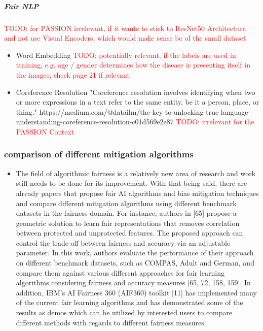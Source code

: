 \documentclass[12pt, a4paper, oneside]{book}   	%
\renewcommand{\todo}[1]{\textcolor{red}{TODO: #1}}
\renewcommand{\paragraph}[1]{%
	\subsubsection*{#1}%
}
\begin{document}
			\subparagraph{Fair NLP}
				\todo{for PASSION irrelevant, if it wants to stick to ResNet50 Architecture \autocite{Gottfrois2024} and not use Visual Encoders, which would make sense bc of the small dataset}
				\begin{itemize}
					\item Word Embedding \todo{potentially relevant, if the labels are used in training, e.g. age / gender determines how the disease is presenting itself in the images; check \autocite{Mehrabi_2021} page 21 if relevant}
					\item Coreference Resolution "Coreference resolution involves identifying when two or more expressions in a text refer to the same entity, be it a person, place, or thing." https://medium.com/@datailm/the-key-to-unlocking-true-language-understanding-coreference-resolution-c01d569e2e87 \todo{irrelevant for the PASSION Context}
				\end{itemize}
				
			\paragraph{comparison of different mitigation algorithms}
				\begin{itemize}
					\item The field of algorithmic fairness is a relatively new area of research and work still needs to be done for its improvement. With that being said, there are already papers that propose fair \gls{AI} algorithms and bias mitigation techniques and compare different mitigation algorithms using different benchmark datasets in the fairness domain. For instance, authors in [65] propose a geometric solution to learn fair representations that removes correlation between protected and unprotected features. The proposed approach can control the trade-off between fairness and accuracy via an adjustable parameter. In this work, authors evaluate the performance of their approach on different benchmark datasets, such as COMPAS, Adult and German, and compare them against various different approaches for fair learning algorithms considering fairness and accuracy measures [65, 72, 158, 159]. In addition, IBM’s \gls{AI} Fairness 360 (AIF360) toolkit [11] has implemented many of the current fair learning algorithms and has demonstrated some of the results as demos which can be utilized by interested users to compare different methods with regards to different fairness measures. \autocite{Mehrabi_2021}
				\end{itemize}			
			
\end{document}
